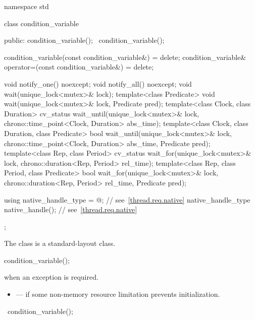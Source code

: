 %
\begin{codeblock}
namespace std {
  class condition_variable {
  public:
    condition_variable();
    ~condition_variable();

    condition_variable(const condition_variable&) = delete;
    condition_variable& operator=(const condition_variable&) = delete;

    void notify_one() noexcept;
    void notify_all() noexcept;
    void wait(unique_lock<mutex>& lock);
    template<class Predicate>
      void wait(unique_lock<mutex>& lock, Predicate pred);
    template<class Clock, class Duration>
      cv_status wait_until(unique_lock<mutex>& lock,
                           chrono::time_point<Clock, Duration> abs_time);
    template<class Clock, class Duration, class Predicate>
      bool wait_until(unique_lock<mutex>& lock,
                      chrono::time_point<Clock, Duration> abs_time,
                      Predicate pred);
    template<class Rep, class Period>
      cv_status wait_for(unique_lock<mutex>& lock,
                         chrono::duration<Rep, Period> rel_time);
    template<class Rep, class Period, class Predicate>
      bool wait_for(unique_lock<mutex>& lock,
                    chrono::duration<Rep, Period> rel_time,
                    Predicate pred);

    using native_handle_type = @\impdefnc@;          // see~\ref{thread.req.native}
    native_handle_type native_handle();                         // see~\ref{thread.req.native}
  };
}
\end{codeblock}

\pnum
The class  is a standard-layout class.

%
\begin{itemdecl}
condition_variable();
\end{itemdecl}

\begin{itemdescr}
\pnum
\throws
{} when an exception is required.

\pnum
\errors
\begin{itemize}
\item {} --- if some non-memory resource
limitation prevents initialization.
\end{itemize}
\end{itemdescr}

%
\begin{itemdecl}
~condition_variable();
\end{itemdecl}

